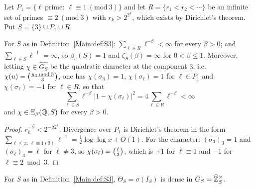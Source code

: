 \begin{definition}\label{Main:def:S3}
Let $P_1=\{\ell\ \text{prime}:\ \ell\equiv1\ (\mathrm{mod}\ 3)\}$ and let
$R=\{r_1<r_2<\cdots\}$ be an infinite set of primes $\equiv2\ (\mathrm{mod}\ 3)$
with $r_k>2^{2^k}$, which exists by Dirichlet's theorem. Put
$S=\{3\}\cup P_1\cup R$.
\end{definition}

\begin{lemma}\label{Main:lem:S3basic}
For $S$ as in Definition~\ref{Main:def:S3}: $\sum_{\ell\in R}\ell^{-\beta}<\infty$
for every $\beta>0$; and $\sum_{\ell\in S}\ell^{-1}=\infty$, so
$\beta_c(S)=1$ and $\zeta_S(\beta)=\infty$ for $0<\beta\le1$. Moreover, letting
$\chi\in\widehat{G_S}$ be the quadratic character at the component $3$, i.e.\
$\chi(u)=\left(\frac{u_3\bmod3}{3}\right)$, one has $\chi(\sigma_3)=1$, $\chi(\sigma_\ell)=1$
for $\ell\in P_1$ and $\chi(\sigma_\ell)=-1$ for $\ell\in R$, so that
\[
\sum_{\ell\in S}\ell^{-\beta}\bigl|1-\chi(\sigma_\ell)\bigr|^2=4\sum_{\ell\in R}\ell^{-\beta}<\infty
\]
and $\chi\in\Xi_\beta(\mathbb{Q},S)$ for every $\beta>0$.
\end{lemma}

\begin{proof}
$r_k^{-\beta}<2^{-\beta2^k}$. Divergence over $P_1$ is Dirichlet's theorem in
the form $\sum_{\ell\le x,\ \ell\equiv1(3)}\ell^{-1}=\tfrac12\log\log x+O(1)$.
For the character: $(\sigma_3)_3=1$ and $(\sigma_\ell)_3=\ell$ for
$\ell\neq3$, so $\chi(\sigma_\ell)=\left(\frac{\ell}{3}\right)$, which is $+1$ for
$\ell\equiv1$ and $-1$ for $\ell\equiv2\bmod3$.
\end{proof}

\begin{proposition}\label{Main:prop:dense}
For $S$ as in Definition~\ref{Main:def:S3}, $\Theta_S=\sigma(I_S)$ is dense in
$G_S=\widehat{\mathbb{Z}}_S^\times$.
\end{proposition}

